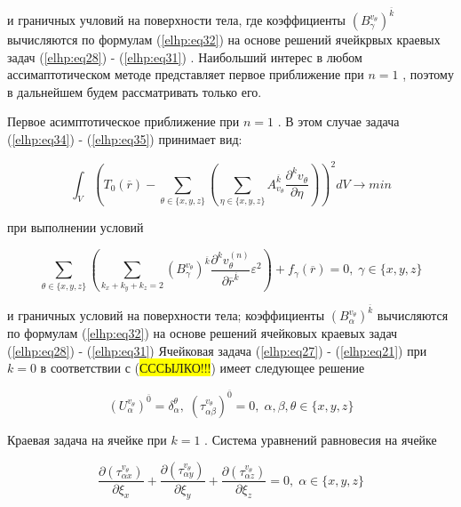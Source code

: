 и граничных учловий на поверхности тела, где коэффициенты 
$\left( B_{\gamma}^{v_{\theta}} \right)^{ \overline{k} }$ 
вычисляются по формулам 
(\ref{elhp:eq32})
на основе решений ячейкрвых краевых задач 
(\ref{elhp:eq28})
-
(\ref{elhp:eq31})
.
Наибольший интерес в любом ассимаптотическом методе представляет первое приближение при 
$n=1$
, поэтому в дальнейшем будем рассматривать
только его.

Первое асимптотическое приближение при 
$n=1$
. В этом случае задача 
(\ref{elhp:eq34})
-
(\ref{elhp:eq35})
принимает вид:

\begin{equation}
    \label{elhp:eq36}
    \int_V \left( 
    T_0 \left( \overline{r}  \right) - 
    \sum_{ \theta \in \{x,y,z\} } \left( 
        \sum_{ \eta \in \{x,y,z\} } A_{v_{\theta}}^{ \overline{k} } \frac{\partial^k v_{\theta}}{\partial \eta } 
    \right)   \right)^2
    dV \rightarrow min
\end{equation}

при выполнении условий

\begin{equation}
    \label{elhp:eq37}
    \sum_{ \theta \in \{x,y,z\} } 
    \left( 
        \sum_{k_x+k_y+k_z = 2}
        \left( B_{\gamma}^{v_{\theta}} \right)^{ \overline{k} }
        \frac{\partial^k v_{\theta}^{(n)}}{\partial \overline{r}^{ \overline{k}}}
        \varepsilon^2
    \right) 
    + f_{ \gamma} \left( \overline{r}  \right) = 0
    ,\;
    \gamma \in \{x,y,z\} 
\end{equation}

и граничных условий на поверхности тела; коэффициенты
$ \left( B_{\alpha}^{ v_{\theta}} \right)^{ \overline{k}} $
вычисляются по формулам
(\ref{elhp:eq32})
на основе решений ячейковых краевых задач 
(\ref{elhp:eq28})
-
(\ref{elhp:eq31})
Ячейковая задача 
(\ref{elhp:eq27})
-
(\ref{elhp:eq21})
при $k=0$ в соответствии с (\colorbox{yellow}{СССЫЛКО!!!}) имеет следующее решение

\begin{equation}
    \label{elhp:eq38}
    \left( U_{\alpha}^{v_{\theta}} \right)^{ \overline{0} } = \delta_{\alpha}^{\theta}
    ,\;
    \left( \tau_{\alpha\beta}^{v_{\theta}} \right)^{ \overline{0} } = 0
    ,\;
    \alpha,\beta,\theta \in \{x,y,z\} 
\end{equation}

Краевая задача на ячейке при 
$k=1$
. Система уравнений равновесия на ячейке

\begin{equation}
    \label{elhp:eq39}
    \frac{\partial \left(  \tau_{\alpha x}^{v_{\theta}}\right) }{\partial \xi_x} +
    \frac{\partial \left(  \tau_{\alpha y}^{v_{\theta}}\right) }{\partial \xi_y} +
    \frac{\partial \left(  \tau_{\alpha z}^{v_{\theta}}\right) }{\partial \xi_z} = 0
    ,\;
    \alpha \in \{x,y,z\} 
\end{equation}

